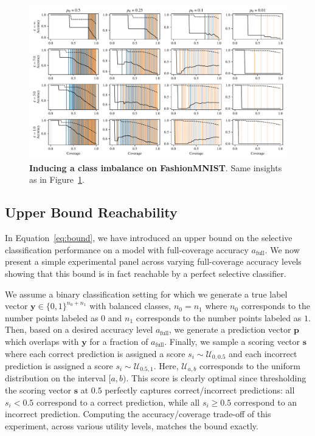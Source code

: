 \begin{figure}[t]
  \centering
	  \includegraphics[width=\linewidth]{figs/sptd_dp/fashionmnist_classimb.pdf}
  
\caption[Inducing a class imbalance on FashionMNIST.]{\textbf{Inducing a class imbalance on FashionMNIST}. Same insights as in Figure~\ref{fig:fashionmnist_classimb}.}
\label{fig:fashionmnist_classimb}
\end{figure}

\subsection{Upper Bound Reachability}
\label{sec:opt_bound_reach}

In Equation~\ref{eq:bound}, we have introduced an upper bound on the selective classification performance on a model with full-coverage accuracy $a_\text{full}$. We now present a simple experimental panel across varying full-coverage accuracy levels showing that this bound is in fact reachable by a perfect selective classifier.

We assume a binary classification setting for which we generate a true label vector $\bm{y} \in \{0,1\}^{n_0 + n_1}$ with balanced classes, \ie $n_0 = n_1$ where $n_0$ corresponds to the number points labeled as $0$ and $n_1$ corresponds to the number points labeled as $1$. Then, based on a desired accuracy level $a_\text{full}$, we generate a prediction vector $\bm{p}$ which overlaps with $\bm{y}$ for a fraction of $a_\text{full}$. Finally, we sample a  scoring vector $\bm{s}$ where each correct prediction is assigned a score $s_i \sim \mathcal{U}_{0,0.5}$ and each incorrect prediction is assigned a score $s_i \sim \mathcal{U}_{0.5,1}$. Here, $\mathcal{U}_{a,b}$ corresponds to the uniform distribution on the interval $[a,b)$. This score is clearly optimal since thresholding the scoring vector $\bm{s}$ at $0.5$ perfectly captures correct/incorrect predictions: all $s_i < 0.5$ correspond to a correct prediction, while all $s_i \geq 0.5$ correspond to an incorrect prediction. Computing the accuracy/coverage trade-off of this experiment, across various utility levels, matches the bound exactly. 

